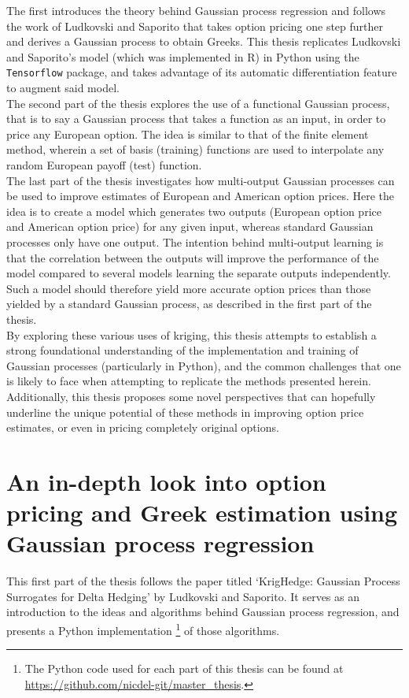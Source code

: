 \documentclass[a4paper,12pt]{article}
\begin{document}
The first introduces the theory behind Gaussian process regression and follows the work of Ludkovski and Saporito \cite{Ludkovski2020} that takes option pricing one step further and derives a Gaussian process to obtain Greeks. This thesis replicates Ludkovski and Saporito's model (which was implemented in R) in Python using the \texttt{Tensorflow} package, and takes advantage of its automatic differentiation feature to augment said model.\\
The second part of the thesis explores the use of a functional Gaussian process, that is to say a Gaussian process that takes a function as an input, in order to price any European option. The idea is similar to that of the finite element method, wherein a set of basis (training) functions are used to interpolate any random European payoff (test) function.\\
The last part of the thesis investigates how multi-output Gaussian processes can be used to improve estimates of European and American option prices. Here the idea is to create a model which generates two outputs (European option price and American option price) for any given input, whereas standard Gaussian processes only have one output. The intention behind multi-output learning is that the correlation between the outputs will improve the performance of the model compared to several models learning the separate outputs independently. Such a model should therefore yield more accurate option prices than those yielded by a standard Gaussian process, as described in the first part of the thesis.\\
By exploring these various uses of kriging, this thesis attempts to establish a strong foundational understanding of the implementation and training of Gaussian processes (particularly in Python), and the common challenges that one is likely to face when attempting to replicate the methods presented herein. Additionally, this thesis proposes some novel perspectives that can hopefully underline the unique potential of these methods in improving option price estimates, or even in pricing completely original options.


\section{An in-depth look into option pricing and Greek estimation using Gaussian process regression \label{sec:ludkovski}}
This first part of the thesis follows the paper \cite{Ludkovski2020} titled `KrigHedge: Gaussian Process Surrogates for Delta Hedging' by Ludkovski and Saporito. It serves as an introduction to the ideas and algorithms behind Gaussian process regression, and presents a Python implementation \footnote{The Python code used for each part of this thesis can be found at \url{https://github.com/nicdel-git/master_thesis}.} of those algorithms.
\end{document}

